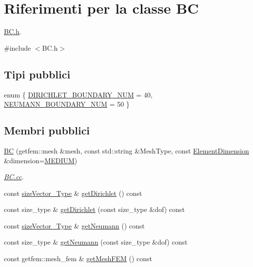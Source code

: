 \hypertarget{classBC}{\section{Riferimenti per la classe B\-C}
\label{classBC}
}


\hyperlink{BC_8h}{B\-C.\-h}.  




{\ttfamily \#include $<$B\-C.\-h$>$}

\subsection*{Tipi pubblici}
\begin{DoxyCompactItemize}
\item 
enum \{ \hyperlink{classBC_ad1b507696802f73b95c0ca59f4c41390a99103ccd54ba29b1bd2670cc6cd0c462}{D\-I\-R\-I\-C\-H\-L\-E\-T\-\_\-\-B\-O\-U\-N\-D\-A\-R\-Y\-\_\-\-N\-U\-M} = 40, 
\hyperlink{classBC_ad1b507696802f73b95c0ca59f4c41390a432aa77a00d8eb4929463ef8d57b5c04}{N\-E\-U\-M\-A\-N\-N\-\_\-\-B\-O\-U\-N\-D\-A\-R\-Y\-\_\-\-N\-U\-M} = 50
 \}
\end{DoxyCompactItemize}
\subsection*{Membri pubblici}
\begin{DoxyCompactItemize}
\item 
\hyperlink{classBC_a75c13d0876a8230d1ec702341182da1c}{B\-C} (getfem\-::mesh \&mesh, const std\-::string \&Mesh\-Type, const \hyperlink{Core_8h_a419d7707e418f02d8daeb1fc7c0b9ae5}{Element\-Dimension} \&dimension=\hyperlink{Core_8h_a419d7707e418f02d8daeb1fc7c0b9ae5a5340ec7ecef6cc3886684a3bd3450d64}{M\-E\-D\-I\-U\-M})
\begin{DoxyCompactList}\small\item\em \hyperlink{BC_8cc}{B\-C.\-cc}. \end{DoxyCompactList}\item 
const \hyperlink{Core_8h_a83c51913d041a5001e8683434c09857f}{size\-Vector\-\_\-\-Type} \& \hyperlink{classBC_af2d22ae9848e3bed61f2106610bde5b7}{get\-Dirichlet} () const 
\item 
const size\-\_\-type \& \hyperlink{classBC_ae61f04dfbb377e38e4c43e0516e51c36}{get\-Dirichlet} (const size\-\_\-type \&dof) const 
\item 
const \hyperlink{Core_8h_a83c51913d041a5001e8683434c09857f}{size\-Vector\-\_\-\-Type} \& \hyperlink{classBC_a9541adfa180ca9783052349c373b0228}{get\-Neumann} () const 
\item 
const size\-\_\-type \& \hyperlink{classBC_a88bd7cd141cda536ce128f13b17d61b5}{get\-Neumann} (const size\-\_\-type \&dof) const 
\item 
const getfem\-::mesh\-\_\-fem \& \hyperlink{classBC_a920bf87c4fe5c10289923859f3ca7afc}{get\-Mesh\-F\-E\-M} () const 
\end{DoxyCompactItemize}


